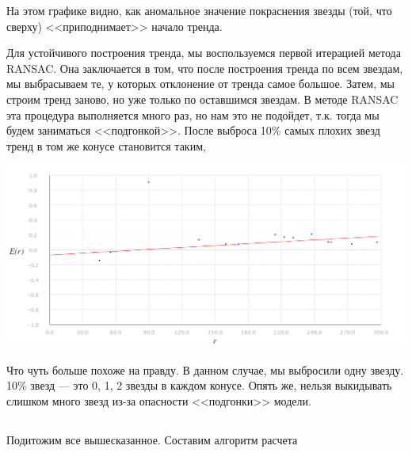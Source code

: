 \documentclass[14pt]{article}
\begin{document}
                На этом графике видно, как аномальное значение покраснения звезды (той, что сверху) <<приподнимает>> начало тренда.
                
                
                Для устойчивого построения тренда, мы воспользуемся первой итерацией метода RANSAC. Она заключается в том, что после построения тренда по всем звездам, мы выбрасываем те, у которых отклонение от тренда самое большое. Затем, мы строим тренд заново, но уже только по оставшимся звездам. В методе RANSAC эта процедура выполняется много раз, но нам это не подойдет, т.к. тогда мы будем заниматься <<подгонкой>>. После выброса 10\% самых плохих звезд тренд в том же конусе становится таким,
                \begin{center}
                    \includegraphics[scale=0.4]{ransac.png}
                \end{center} 
                
                Что чуть больше похоже на правду. В данном случае, мы выбросили одну звезду. 10\% звезд --- это 0, 1, 2 звезды в каждом конусе. Опять же, нельзя выкидывать слишком много звезд из-за опасности <<подгонки>> модели.     
                
        \subsection{}
            Подитожим все вышесказанное. Составим алгоритм расчета             
                
    

    
\end{document}
